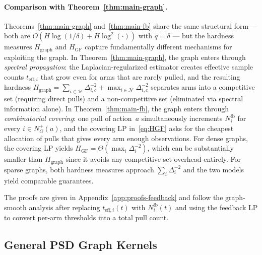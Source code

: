 \documentclass{article}
\begin{document}
\paragraph{Comparison with Theorem~\ref{thm:main-graph}.}
Theorems~\ref{thm:main-graph} and~\ref{thm:main-fb} share the same structural
form --- both are $O(H\log(1/\delta) + H\log^2(\cdot))$ with $q=\delta$ --- but
the hardness measures $H_{\mathrm{graph}}$ and $H_{\mathrm{GF}}$ capture
fundamentally different mechanisms for exploiting the graph.
In Theorem~\ref{thm:main-graph}, the graph enters through \emph{spectral
propagation}: the Laplacian-regularized estimator creates effective sample counts
$t_{\mathrm{eff},i}$ that grow even for arms that are rarely pulled, and the
resulting hardness $H_{\mathrm{graph}} = \sum_{i\in\mathcal H}\Delta_{i,c}^{-2}
+ \max_{i\in\mathcal N}\Delta_{i,c}^{-2}$ separates arms into a competitive set
(requiring direct pulls) and a non-competitive set (eliminated via spectral
information alone).
In Theorem~\ref{thm:main-fb}, the graph enters through \emph{combinatorial
covering}: one pull of action~$a$ simultaneously increments $N_i^{\mathrm{fb}}$
for every $i\in N_G^+(a)$, and the covering LP in~\eqref{eq:HGF} asks for the
cheapest allocation of pulls that gives every arm enough observations.
For dense graphs, the covering LP yields $H_{\mathrm{GF}} =
\Theta(\max_i\Delta_i^{-2})$, which can be substantially smaller than
$H_{\mathrm{graph}}$ since it avoids any competitive-set overhead entirely.
For sparse graphs, both hardness measures approach $\sum_i\Delta_i^{-2}$ and
the two models yield comparable guarantees.

The proofs are given in Appendix~\ref{app:proofs-feedback} and follow the graph-smooth analysis after replacing $t_{\mathrm{eff},i}(t)$ with $N_i^{\mathrm{fb}}(t)$ and using the feedback LP to convert per-arm thresholds into a total pull count.

\subsection{General PSD Graph Kernels}\label{sec:kernel}
\end{document}
